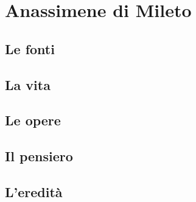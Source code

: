 \chapter{Anassimene di Mileto}

\section{Le fonti}

\section{La vita}

\section{Le opere}

\section{Il pensiero}

\section{L'eredità}
